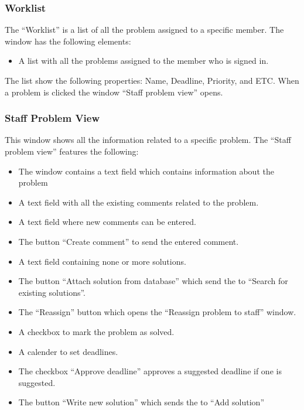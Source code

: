 

\subsubsection{Worklist}
The ``Worklist'' is a list of all the problem assigned to a specific \astaff member. The window has the following elements:
\begin{itemize}
	\item A list with all the problems assigned to the \astaff member who is signed in.
\end{itemize}
The list show the following properties: Name, Deadline, Priority, and ETC.
When a problem is clicked the window ``Staff problem view'' opens. 


\subsubsection{Staff Problem View}
This window shows all the information related to a specific problem. 
The ``Staff problem view'' features the following:
\begin{itemize}
	\item The window contains a text field which contains information about the problem
	\item A text field with all the existing comments related to the problem.
	\item A text field where new comments can be entered.
	\item The button ``Create comment'' to send the entered comment.
	\item A text field containing none or more solutions.
	\item The button ``Attach solution from database'' which send the \astaff[] to ``Search for existing solutions''.  
	\item The ``Reassign'' button which opens the ``Reassign problem to staff'' window.
	\item A checkbox to mark the problem as solved.
	\item A calender to set deadlines.
	\item The checkbox ``Approve deadline'' approves a suggested deadline if one is suggested.
	\item The button ``Write new solution'' which sends the \astaff[] to ``Add solution''
\end{itemize}

